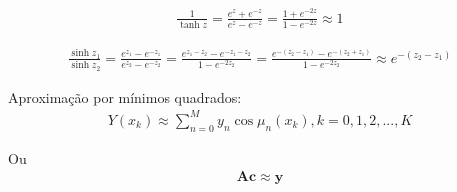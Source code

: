 \begin{align}
\frac{1}{\tanh z} = \frac{e^z + e^{-z}}{e^z - e^{-z}} = \frac{1 + e^{-2z}}{1 - e^{-2z}} \approx 1
\end{align}

\begin{align}
\frac{\sinh z_1}{\sinh z_2} = \frac{e^{z_1} - e^{-z_1}}{e^{z_2} - e^{-z_2}}
 = \frac{e^{z_1-z_2} - e^{-z_1-z_2}}{1 - e^{-2z_2}}
  = \frac{e^{-(z_2-z_1)} - e^{-(z_2+z_1)}}{1 - e^{-2z_2}}
  \approx e^{-(z_2-z_1)}
\end{align}

Aproximação por mínimos quadrados:
\begin{align}
Y(x_k) \approx \sum_{n=0}^M y_n \cos \mu_n(x_k), k=0,1,2,..., K
\end{align}

Ou
\begin{align}
\mathbf{A}\mathbf{c} \approx \mathbf{y}
\end{align}

